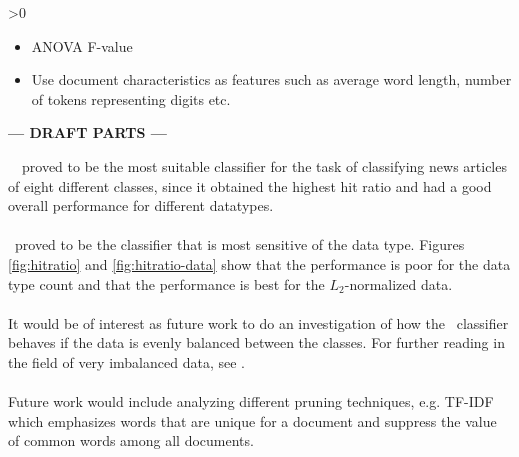 \ifnum\printdraft>0
	\begin{itemize}
		\item ANOVA F-value
		\item Use document characteristics as features such as average word length, number of tokens representing digits etc.
	\end{itemize}
\else
\begin{center}
	\textbf{--- DRAFT PARTS ---}
\end{center}
\fi
\mn\ \nb\ proved to be the most suitable classifier for the task of classifying news articles of eight different classes, since it obtained the highest hit ratio and had a good overall performance for different datatypes.
\\\\
\svm\ proved to be the classifier that is most sensitive of the data type. Figures \ref{fig:hitratio} and \ref{fig:hitratio-data} show that the performance is poor for the data type count and that the performance is best for the $L_2$-normalized data.
\\\\
It would be of interest as future work to do an investigation of how the \rf\ classifier behaves if the data is evenly balanced between the classes. For further reading in the field of very imbalanced data, see \cite{Chen}.
\\\\
Future work would include analyzing different pruning techniques, e.g. TF-IDF which emphasizes words that are unique for a document and suppress the value of common words among all documents. 
